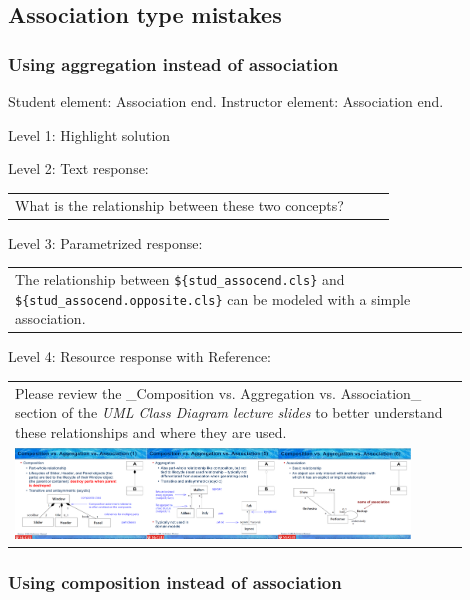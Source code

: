\subsection{Association type mistakes}

\subsubsection{Using aggregation instead of association}

Student element: Association end. Instructor element: Association end. \medskip

\noindent Level 1: Highlight solution  \medskip

\noindent Level 2: Text response: \medskip

\begin{tabular}{|p{0.9\linewidth}}
What is the relationship between these two concepts?
\end{tabular} \medskip

\noindent Level 3: Parametrized response: \medskip

\begin{tabular}{|p{0.9\linewidth}}
The relationship between \verb|${stud_assocend.cls}| and \verb|${stud_assocend.opposite.cls}| can be modeled with a simple association.
\end{tabular} \medskip

\noindent Level 4: Resource response with Reference: \medskip

\begin{tabular}{|p{0.9\linewidth}}
Please review the _Composition vs. Aggregation vs. Association_ section of 
the \textit{UML Class Diagram lecture slides} to 
better understand these relationships and where they are used.

\\
\includegraphics[width=0.9\textwidth]{images/composition_aggregation_association.png}
\end{tabular} \medskip


\subsubsection{Using composition instead of association}

